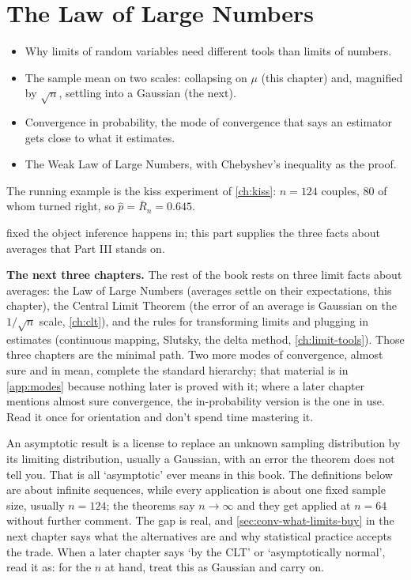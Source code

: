 \chapter{The Law of Large Numbers}
\label{ch:lln}

\begin{chaptergoals}
\begin{itemize}[nosep]
\item Why limits of random variables need different tools than limits of numbers.
\item The sample mean on two scales: collapsing on $\mu$ (this chapter) and, magnified by $\sqrt{n}$, settling into a Gaussian (the next).
\item Convergence in probability, the mode of convergence that says an estimator gets close to what it estimates.
\item The Weak Law of Large Numbers, with Chebyshev's inequality as the proof.
\end{itemize}
The running example is the kiss experiment of \cref{ch:kiss}: $n = 124$ couples, $80$ of whom turned right, so $\hat{p} = \bar{R}_n = 0.645$.

 fixed the object inference happens in; this part supplies the three facts about averages that Part III stands on.

\textbf{The next three chapters.}
The rest of the book rests on three limit facts about averages: the Law of Large Numbers (averages settle on their expectations, this chapter), the Central Limit Theorem (the error of an average is Gaussian on the $1/\sqrt{n}$ scale, \cref{ch:clt}), and the rules for transforming limits and plugging in estimates (continuous mapping, Slutsky, the delta method, \cref{ch:limit-tools}).
Those three chapters are the minimal path.
Two more modes of convergence, almost sure and in mean, complete the standard hierarchy; that material is in \cref{app:modes} because nothing later is proved with it; where a later chapter mentions almost sure convergence, the in-probability version is the one in use.
Read it once for orientation and don't spend time mastering it.
\end{chaptergoals}

\begin{intuition}
An asymptotic result is a license to replace an unknown sampling distribution by its limiting distribution, usually a Gaussian, with an error the theorem does not tell you.
That is all `asymptotic' ever means in this book.
The definitions below are about infinite sequences, while every application is about one fixed sample size, usually $n = 124$; the theorems say $n \to \infty$ and they get applied at $n = 64$ without further comment.
The gap is real, and \cref{sec:conv-what-limits-buy} in the next chapter says what the alternatives are and why statistical practice accepts the trade.
When a later chapter says `by the CLT' or `asymptotically normal', read it as: for the $n$ at hand, treat this as Gaussian and carry on.
\end{intuition}

